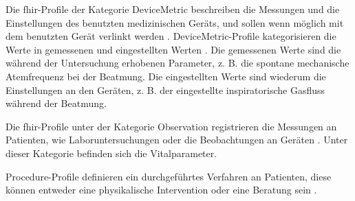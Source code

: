 Die \ac{fhir}-Profile der Kategorie \glqq DeviceMetric\grqq{} beschreiben die Messungen und die Einstellungen des benutzten medizinischen Geräts, und sollen wenn möglich mit dem benutzten Gerät verlinkt werden \cite{icukdz}. \glqq DeviceMetric\grqq{}-Profile kategorisieren die Werte in gemessenen und eingestellten Werten \cite{devicemetric}. Die gemessenen Werte sind die während der Untersuchung erhobenen Parameter, z. B. die spontane mechanische Atemfrequenz bei der Beatmung. Die eingestellten Werte sind wiederum die Einstellungen an den Geräten, z. B. der eingestellte inspiratorische Gasfluss während der Beatmung.

Die \ac{fhir}-Profile unter der Kategorie \glqq Observation\grqq{} registrieren die Messungen an Patienten, wie Laboruntersuchungen oder die Beobachtungen an Geräten \cite{observation}. Unter dieser Kategorie befinden sich die Vitalparameter.

\glqq Procedure\grqq{}-Profile definieren ein durchgeführtes Verfahren an Patienten, diese können entweder eine physikalische Intervention oder eine Beratung sein \cite{procedure}.
